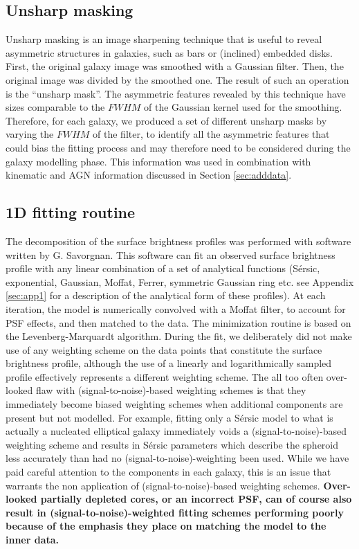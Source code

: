 \documentclass[preprint2]{emulateapj}
\begin{document}
\subsection{Unsharp masking}
Unsharp masking is an image sharpening technique that is useful to reveal asymmetric structures in galaxies, 
such as bars or (inclined) embedded disks. 
First, the original galaxy image was smoothed with a Gaussian filter.
Then, the original image was divided by the smoothed one. 
The result of such an operation is the ``unsharp mask''. 
The asymmetric features revealed by this technique have sizes 
comparable to the $FWHM$ of the Gaussian kernel used for the smoothing.
Therefore, for each galaxy, we produced a set of different unsharp masks by varying the $FWHM$ of the filter,
to identify all the asymmetric features that could bias the fitting process 
and may therefore need to be considered during the galaxy modelling phase.
This information was used in combination with kinematic and AGN information discussed in Section \ref{sec:adddata}.

\subsection{1D fitting routine}
The decomposition of the surface brightness profiles was performed with software written by G. Savorgnan.
This software can fit an observed surface brightness profile with any linear combination of 
a set of analytical functions (S\'ersic, exponential, Gaussian, Moffat, Ferrer, symmetric Gaussian ring etc. 
see Appendix \ref{sec:app1} for a description of the analytical form of these profiles).
At each iteration, 
the model is numerically convolved with a Moffat filter, to account for PSF effects, 
and then matched to the data.
The minimization routine is based on the Levenberg-Marquardt algorithm.
During the fit, we deliberately did not make use of any weighting scheme on the data points that constitute the 
surface brightness profile, 
although the use of a linearly and logarithmically sampled profile effectively represents a different weighting scheme.
The all too often over-looked flaw with (signal-to-noise)-based weighting schemes 
is that they immediately become biased weighting schemes when additional components are present but not modelled.
For example, fitting only a S\'ersic model to what is actually a nucleated elliptical galaxy immediately voids 
a (signal-to-noise)-based weighting scheme 
and results in S\'ersic parameters which describe the spheroid less accurately than had no (signal-to-noise)-weighting been used.
While we have paid careful attention to the components in each galaxy, 
this is an issue that warrants the non application of (signal-to-noise)-based weighting schemes.
{\bf Over-looked partially depleted cores, or an incorrect PSF, can of course also result in (signal-to-noise)-weighted fitting schemes 
performing poorly because of the emphasis they place on matching the model to the inner data. }
\end{document}
